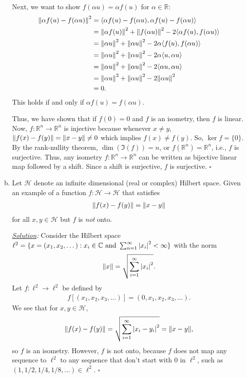 \documentclass[11pt]{article}
\begin{document}
\begin{enumerate}[(a)]
	
	Next, we want to show $f(\alpha u) = \alpha f(u)$ for $\alpha \in \mathbb{R}$:
	\begin{align*}
	\norm{\alpha f(u) - f(\alpha u)}^2 &= \langle \alpha f(u) - f(\alpha u), \alpha f(u) - f(\alpha u)  \rangle\\
	&= \norm{\alpha f(u)}^2 + \norm{f(\alpha u)}^2 -2\langle \alpha f(u),f(\alpha u) \rangle  \\
	&= \norm{\alpha u}^2 + \norm{\alpha u}^2 -2 \alpha\langle  f(u),f(\alpha u) \rangle \\
	&= \norm{\alpha u}^2 + \norm{\alpha u}^2 -2 \alpha\langle  u,\alpha u \rangle \\
	&= \norm{\alpha u}^2 + \norm{\alpha u}^2 -2 \langle \alpha u,\alpha u \rangle \\
	&= \norm{\alpha u}^2 + \norm{\alpha u}^2 -2\norm{\alpha u}^2 \\
	&= 0.
	\end{align*}
	This holds if and only if $\alpha f(u) = f(\alpha u)$. 
	
	
	Thus, we have shown that if $f(0) = 0$ and $f$ is an isometry, then $f$ is linear. Now, $f: \mathbb{R}^n \to \mathbb{R}^n$ is injective because whenever $x\neq y$, $\norm{f(x) - f(y)} = \norm{x-y} \neq 0$ which implies $f(x)\neq f(y)$. So, $\ker{f} = \{0\}$. By the rank-nullity theorem, $\dim\left( \Im(f)\right) = n$, or $f(\mathbb{R}^n) = \mathbb{R}^n$, i.e., $f$ is surjective. Thus, any isometry $f: \mathbb{R}^n \to \mathbb{R}^n$ can be written as bijective linear map followed by a shift. Since a shift is surjective, $f$ is surjective. \hfill$\square$ 
	
	
	
	
	
	\item Let $\mathcal{H}$ denote an infinite dimensional (real or complex) Hilbert space. Given an example of a function $f: \mathcal{H} \to \mathcal{H}$ that satisfies 
	\begin{align*}
	\norm{f(x) - f(y)} = \norm{x-y}
	\end{align*} 
	for all $x,y\in \mathcal{H}$ but $f$ is \textit{not} onto. 
	
	
	
	
	\noindent \textit{\underline{Solution}:} Consider the Hilbert space $\ell^2 = \{x = (x_1,x_2,\dots): x_i \in \mathbb{C} \mbox{ and } \sum^\infty_{n=1}\abs{x_i}^2 < \infty  \} $ with the norm
	\begin{align*}
	\norm{x} = \sqrt{\sum^\infty_{i=1}\abs{x_i}^2}.
	\end{align*} 
	Let $f: \ell^2 \to \ell^2$ be defined by
	\begin{align*}
	f[(x_1,x_2,x_3,\dots)] = (0,x_1,x_2,x_3,\dots).
	\end{align*}
	We see that for $x,y\in \mathcal{H}$, 
	\begin{align*}
	\norm{f(x)-f(y)} = \sqrt{\sum^\infty_{i=1}\abs{x_i - y_i}^2} = \norm{x-y},
	\end{align*}
	so $f$ is an isometry. However, $f$ is not onto, because $f$ does not map any sequence to $\ell^2$ to any sequence that don't start with $0$ in $\ell^2$, such as $(1,1/2,1/4,1/8,\dots) \in \ell^2$. \hfill $\square$ 
	
	
	
	
	
\end{enumerate}
\end{document}
